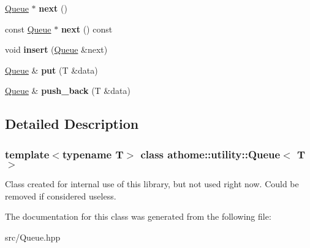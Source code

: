 \begin{DoxyCompactItemize}
\mbox{\hyperlink{classathome_1_1utility_1_1_queue}{Queue}} $\ast$ {\bfseries next} ()
\item 
\mbox{\label{classathome_1_1utility_1_1_queue_a481c95408b3267ef7ee256ad47880991}} 
const \mbox{\hyperlink{classathome_1_1utility_1_1_queue}{Queue}} $\ast$ {\bfseries next} () const
\item 
\mbox{\label{classathome_1_1utility_1_1_queue_ab326befaa9953ede0d27b89e173bf40e}} 
void {\bfseries insert} (\mbox{\hyperlink{classathome_1_1utility_1_1_queue}{Queue}} \&next)
\item 
\mbox{\label{classathome_1_1utility_1_1_queue_a1baa62a0fe63cbd5f46e8e25b5341dd0}} 
\mbox{\hyperlink{classathome_1_1utility_1_1_queue}{Queue}} \& {\bfseries put} (T \&data)
\item 
\mbox{\label{classathome_1_1utility_1_1_queue_aebcd042029b3cb1e5e4c288c37f5067e}} 
\mbox{\hyperlink{classathome_1_1utility_1_1_queue}{Queue}} \& {\bfseries push\+\_\+back} (T \&data)
\end{DoxyCompactItemize}


\subsection{Detailed Description}
\subsubsection*{template$<$typename T$>$\newline
class athome\+::utility\+::\+Queue$<$ T $>$}

Class created for internal use of this library, but not used right now. Could be removed if considered useless. 

The documentation for this class was generated from the following file\+:\begin{DoxyCompactItemize}
\item 
src/Queue.\+hpp\end{DoxyCompactItemize}
